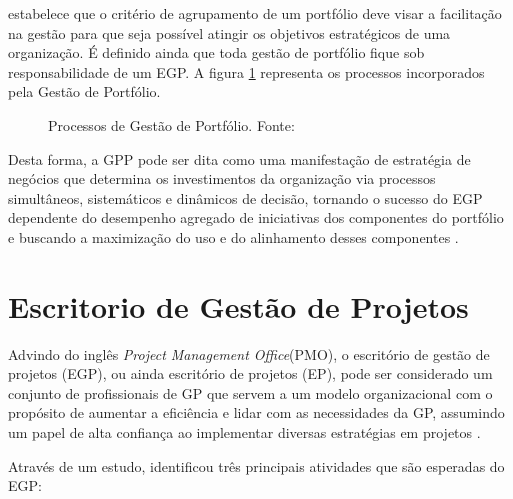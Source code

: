    estabelece que o critério de agrupamento de um portfólio deve visar a facilitação na gestão para que seja possível atingir os objetivos estratégicos de uma organização. É definido ainda que toda gestão de portfólio fique sob responsabilidade de um EGP. A figura \ref{estrategia_portfolio} representa os processos incorporados pela Gestão de Portfólio.

  \begin{figure}[!h]
    \centering
    \caption{Processos de Gestão de Portfólio. Fonte: \cite{pmi2006}}
    \label{estrategia_portfolio}
  \end{figure}

  Desta forma, a GPP pode ser dita como uma manifestação de estratégia de negócios que determina os investimentos da organização via processos simultâneos, sistemáticos e dinâmicos de decisão, tornando o sucesso do EGP dependente do desempenho agregado de iniciativas dos componentes do portfólio e buscando a maximização do uso e do alinhamento desses componentes \cite{pmiguide2013}.

\section{Escritorio de Gestão de Projetos}

  Advindo do inglês \textit{Project Management Office}(PMO), o escritório de gestão de projetos (EGP), ou ainda escritório de projetos (EP), pode ser considerado um conjunto de profissionais de GP que servem a um modelo organizacional com o propósito de aumentar a eficiência e lidar com as necessidades da GP, assumindo um papel de alta confiança ao implementar diversas estratégias em projetos \cite{kendall2003advanced}.

  Através de um estudo,  identificou três principais atividades que são esperadas do EGP:

